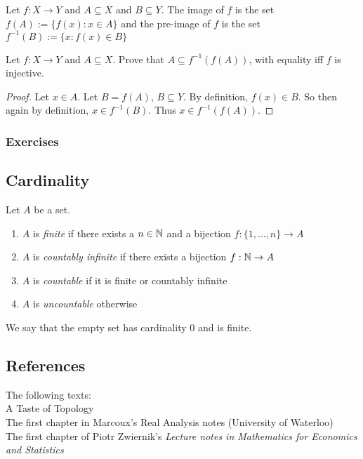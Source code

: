 \documentclass{article}
\begin{document}
\begin{definition}
Let $f:X \to Y$ and $A \subseteq X$ and $B \subseteq Y$. The image of $f$ is the set $f(A) := \{f(x): x \in A \}$ and the pre-image of $f$ is the set $f^{-1}(B) := \{x: f(x) \in B \}$
\end{definition}

\begin{example}
Let $f: X \to Y$ and $A \subseteq X$. Prove that $A \subseteq f^{-1}(f(A))$, with equality iff $f$ is injective. 
\end{example}
\begin{proof}
Let $x \in A$. Let $B = f(A)$, $B \subseteq Y$. By definition, $f(x) \in B$. So then again by definition, $x \in f^{-1}(B)$. Thus $x \in f^{-1}(f(A))$.
\end{proof}

\subsubsection{Exercises}


\subsection{Cardinality}
\begin{definition}
Let $A$ be a set. 
\begin{enumerate}
\item $A$ is \emph{finite} if there exists a $n \in {\mathbb{N}}$ and a bijection $f:\{1,\ldots,n\} \to A$
\item $A$ is \emph{countably infinite} if there exists a bijection $f:{\mathbb{N}}\to A$
\item $A$ is \emph{countable} if it is finite or countably infinite
\item $A$ is \emph{uncountable} otherwise
\end{enumerate}
\end{definition}

We say that the empty set has cardinality 0 and is finite.


\subsection{References}
The following texts: \\
A Taste of Topology \cite{tastetopology}\\
The first chapter in Marcoux's Real Analysis notes (University of Waterloo) \cite{marcoux2019} \\
The first chapter of Piotr Zwiernik's  \textit{Lecture notes in Mathematics for Economics and Statistics} \cite{piotr}
\end{document}
